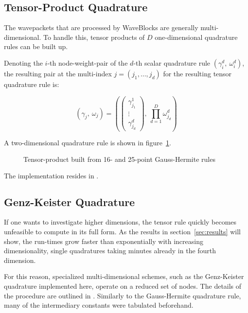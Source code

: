 \subsection{Tensor-Product Quadrature}
\label{subsec:tpquad}

The wavepackets that are processed by WaveBlocks are generally multi-dimensional.
To handle this, tensor products of $D$ one-dimensional quadrature rules can be
built up.

Denoting the $i$-th node-weight-pair of the $d$-th scalar quadrature rule
$(\gamma_i^d,\ \omega_i^d)$, the resulting pair at the multi-index $j = (j_1,
\ldots, j_d)$ for the resulting tensor quadrature rule is:

\begin{equation}
  (\gamma_j,\ \omega_j) = \left(
    \begin{pmatrix} \gamma_{j_1}^1 \\ \vdots \\ \gamma_{j_d}^d \end{pmatrix},
    \ \prod_{d=1}^D \omega_{j_d}^d
  \right)
\end{equation}

A two-dimensional quadrature rule is shown in figure~\ref{fig:tpexample}.

\begin{figure}
  \center
  
  \caption{Tensor-product built from 16- and 25-point Gauss-Hermite rules}
  \label{fig:tpexample}
\end{figure}

The implementation resides in .


\subsection{Genz-Keister Quadrature}
\label{subsec:gkquad}

If one wants to investigate higher dimensions, the tensor rule quickly becomes
unfeasible to compute in its full form.
As the results in section~\ref{sec:results} will show, the run-times grow
faster than exponentially with increasing dimensionality, single quadratures
taking minutes already in the fourth dimension.

For this reason, specialized multi-dimensional schemes, such as the Genz-Keister
quadrature implemented here, operate on a reduced set of nodes.
The details of the procedure are outlined in \cite{B15_601}.
Similarly to the Gauss-Hermite quadrature rule, many of the intermediary
constants were tabulated beforehand.


